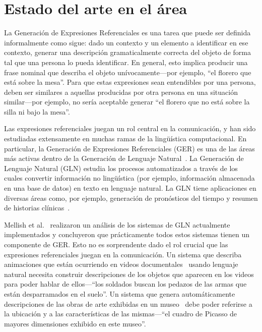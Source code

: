 \section{Estado del arte en el \'area}
\label{intro}

La Generaci\'on de Expresiones Referenciales es una tarea que puede ser definida informalmente como sigue: dado un contexto y un elemento a identificar en ese contexto, generar una descripci\'on gramaticalmente correcta del objeto de forma tal que una persona lo pueda identificar. En general, esto implica producir una frase nominal que describa el objeto un\'ivocamente---por ejemplo, ``el florero que est\'a sobre la mesa''. Para que estas expresiones sean entendibles por una persona, deben ser similares a aquellas producidas por otra persona en una situaci\'on similar---por ejemplo, no ser\'ia aceptable generar ``el florero que no est\'a sobre la silla ni bajo la mesa''. 

Las expresiones referenciales juegan un rol central en la comunicaci\'on, y han sido estudiadas extensamente en muchas ramas de la ling\"u\'istica computacional. En particular, la Generaci\'on de Expresiones Referenciales (GER) es una de las \'areas m\'as activas dentro de la Generaci\'on de Lenguaje Natural~\cite{KrahmerEmielandVanDeemter2011}. La Generaci\'on de Lenguaje Natural (GLN) estudia los procesos automatizados a trav\'es de los cuales convertir informaci\'on no ling\"u\'istica (por ejemplo, informaci\'on almacenada en una base de datos) en texto en lenguaje natural. La GLN tiene aplicaciones en diversas \'areas como, por ejemplo, generaci\'on de pron\'osticos del tiempo y resumen de historias cl\'inicas~\cite{Reiter2000}. 

Mellish et al.~\cite{Mellish2006} realizaron un an\'alisis de los sistemas de GLN actualmente implementados y concluyeron que pr\'acticamente todos estos sistemas tienen un componente de GER. Esto no es sorprendente dado el rol crucial que las expresiones referenciales juegan en la comunicaci\'on. Un sistema que describa animaciones que est\'an ocurriendo en videos documentales~\cite{Callaway2005} usando lenguaje natural necesita construir descripciones de los objetos que aparecen en los videos para poder hablar de ellos---``los soldados buscan los pedazos de las armas que est\'an desparramados en el suelo''. Un sistema que genera autom\'aticamente descripciones de las obras de arte exhibidas en un museo~\cite{Cox1999} debe poder referirse a la ubicaci\'on y a las caracter\'isticas de las mismas---``el cuadro de Picasso de mayores dimensiones exhibido en este museo''. 

